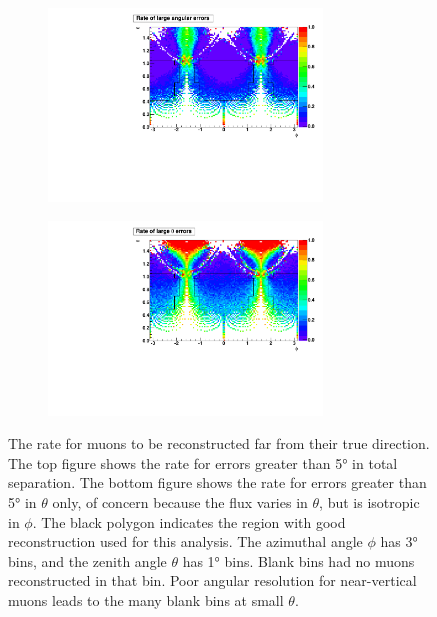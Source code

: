 \documentclass[herrin-thesis.tex]{subfiles}
\begin{document}
 \begin{figure}[htp]
 \centering
 \begin{subfigure}[b]{1.0\textwidth}
 \centering
 \includegraphics[width=0.8\textwidth]{./plots/muon_misrecon_ang_rate.pdf}
 \end{subfigure}
  \begin{subfigure}[b]{1.0\textwidth}
  \centering
   \includegraphics[width=0.8\textwidth]{./plots/muon_misrecon_theta_rate.pdf}
  \end{subfigure}
 \caption[Rate for poorly reconstructing muon angles as a function of angle]{The rate for muons to be reconstructed far from their true direction. The top figure shows the rate for errors greater than \ang{5} in total separation. The bottom figure shows the rate for errors greater than \ang{5} in \(\theta\) only, of concern because the flux varies in \(\theta\), but is isotropic in \(\phi\). The black polygon indicates the region with good reconstruction used for this analysis. The azimuthal angle \(\phi\) has \ang{3} bins, and the zenith angle \(\theta\) has \ang{1} bins. Blank bins had no muons reconstructed in that bin. Poor angular resolution for near-vertical muons leads to the many blank bins at small \(\theta\).}
 \label{fig:muon_misrecon_rate}
 \end{figure}
\end{document}
